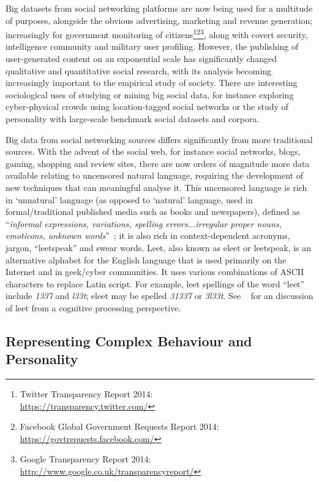 \documentclass[letterpaper]{article}
\begin{document}
Big datasets from social networking platforms are now being used for a
multitude of purposes, alongside the obvious advertising, marketing
and revenue generation; increasingly for government monitoring of
citizens\footnote{Twitter Transparency Report 2014:\\
\url{https://transparency.twitter.com/}}\footnote{Facebook Global
Government Requests Report
2014:\\\url{https://govtrequests.facebook.com/}}\footnote{Google
Transparency Report
2014:\\\url{http://www.google.co.uk/transparencyreport/}}, along with
covert security, intelligence community and military user profiling.
However, the publishing of user-generated content on an exponential
scale has significantly changed qualitative and quantitative social
research, with its analysis becoming increasingly important to the
empirical study of society. There are interesting sociological uses of
studying or mining big social data, for instance exploring
cyber-physical crowds using location-tagged social networks or the
study of personality with large-scale benchmark social datasets and
corpora.

Big data from social networking sources differs significantly from
more traditional sources. With the advent of the social web, for
instance social networks, blogs, gaming, shopping and review sites,
there are now orders of magnitude more data available relating to
uncensored natural language, requiring the development of new
techniques that can meaningful analyse it. This uncensored language is
rich in `unnatural' language (as opposed to `natural'
language, used in formal/traditional published media such as books and
newspapers), defined as ``{\emph{informal expressions, variations,
spelling errors...irregular proper nouns, emoticons, unknown
words}}''~\cite{ULPCproc}; it is also rich in context-dependent
acronyms, jargon, ``leetspeak'' and swear words. Leet, also known as
eleet or leetspeak, is an alternative alphabet for the English
language that is used primarily on the Internet and in geek/cyber
communities. It uses various combinations of ASCII characters to
replace Latin script. For example, leet spellings of the word ``leet''
include {\emph{1337}} and {\emph{l33t}}; eleet may be spelled
{\emph{31337}} or {\emph{3l33t}}. See
\citeauthor{perea-et-al:2008}~ for an
discussion of leet from a cognitive processing perspective.


\subsection{Representing Complex Behaviour and Personality}
\end{document}
